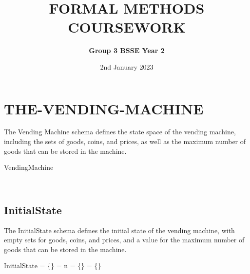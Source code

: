 \documentclass{article}
\title{\huge \textbf{FORMAL METHODS COURSEWORK}}
\author{\textbf{Group 3 BSSE Year 2}}
\date{2nd January 2023}
\begin{document}
\maketitle



\begin{table}[h]
\end{table}


\centering
\section{THE-VENDING-MACHINE}
The Vending Machine schema defines the state space of the vending machine, including the sets of goods, coins, and prices, as well as the maximum number of goods that can be stored in the machine.
\begin{schema}{VendingMachine}
\end{schema} \\

\subsection{InitialState}
The InitialState schema defines the initial state of the vending machine, with empty sets for goods, coins, and prices, and a value for the maximum number of goods that can be stored in the machine.
\begin{schema}{InitialState}
 = \{\}
 = n
 = \{\}
 = \{\}
\end{schema}
\end{document}
